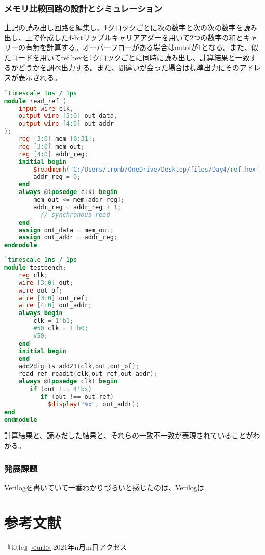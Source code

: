 \documentclass{ltjsarticle}
\begin{document}
\subsubsection{メモリ比較回路の設計とシミュレーション}
上記の読み出し回路を編集し、1クロックごとに次の数字と次の次の数字を読み出し、上で作成した4-bitリップルキャリアアダーを用いて2つの数字の和とキャリーの有無を計算する。オーバーフローがある場合はoutofが1となる。また、似たコードを用いてref.hexを1クロックごとに同時に読み出し、計算結果と一致するかどうかを調べ出力する。また、間違いが会った場合は標準出力にそのアドレスが表示される。
\begin{lstlisting}[caption=メモリ比較回路デザイン,language=verilog]
`timescale 1ns / 1ps
module read_ref ( 
    input wire clk,
    output wire [3:0] out_data,
    output wire [4:0] out_addr
);
    reg [3:0] mem [0:31];
    reg [3:0] mem_out;
    reg [4:0] addr_reg;
    initial begin
        $readmemh("C:/Users/tromb/OneDrive/Desktop/files/Day4/ref.hex", mem);
        addr_reg = 0;
    end
    always @(posedge clk) begin
        mem_out <= mem[addr_reg];
        addr_reg = addr_reg + 1;
          // synchronous read
    end
    assign out_data = mem_out;
    assign out_addr = addr_reg;
endmodule
\end{lstlisting}
\begin{lstlisting}[caption=メモリ比較回路テストベンチ,language=verilog]
`timescale 1ns / 1ps
module testbench;
	reg clk;
	wire [3:0] out;
	wire out_of;
	wire [3:0] out_ref;
	wire [4:0] out_addr;
	always begin
		clk = 1'b1;
		#50 clk = 1'b0;
		#50;
	end
	initial begin  
	end
	add2digits add21(clk,out,out_of);
	read_ref readit(clk,out_ref,out_addr);
	always @(posedge clk) begin
	   if (out !== 4'bx)
	   	  if (out !== out_ref)
	        $display("%x", out_addr);
end
endmodule
\end{lstlisting}
計算結果と、読みだした結果と、それらの一致不一致が表現されていることがわかる。
\subsubsection{発展課題}
Verilogを書いていて一番わかりづらいと感じたのは、Verilogは
\section{参考文献}
『title』\url{<url>} 2021年n月m日アクセス
\end{document}
